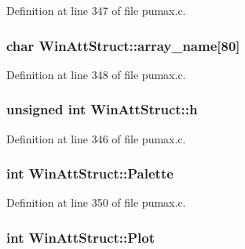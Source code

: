 \-Definition at line 347 of file pumax.\-c.

\hypertarget{struct_win_att_struct_a160c20895e7f5cd3463c955778f18338}{
\subsubsection[{array\-\_\-name}]{\setlength{\rightskip}{0pt plus 5cm}char {\bf \-Win\-Att\-Struct\-::array\-\_\-name}\mbox{[}80\mbox{]}}}
\label{struct_win_att_struct_a160c20895e7f5cd3463c955778f18338}


\-Definition at line 348 of file pumax.\-c.

\hypertarget{struct_win_att_struct_aa9c1c94dee4ebbe95eb392f738835055}{
\subsubsection[{h}]{\setlength{\rightskip}{0pt plus 5cm}unsigned int {\bf \-Win\-Att\-Struct\-::h}}}
\label{struct_win_att_struct_aa9c1c94dee4ebbe95eb392f738835055}


\-Definition at line 346 of file pumax.\-c.

\hypertarget{struct_win_att_struct_a75ef0752e759450856fd5967bdb36587}{
\subsubsection[{\-Palette}]{\setlength{\rightskip}{0pt plus 5cm}int {\bf \-Win\-Att\-Struct\-::\-Palette}}}
\label{struct_win_att_struct_a75ef0752e759450856fd5967bdb36587}


\-Definition at line 350 of file pumax.\-c.

\hypertarget{struct_win_att_struct_ac172f6d90a125507144c20f703b4a0d4}{
\subsubsection[{\-Plot}]{\setlength{\rightskip}{0pt plus 5cm}int {\bf \-Win\-Att\-Struct\-::\-Plot}}}
\label{struct_win_att_struct_ac172f6d90a125507144c20f703b4a0d4}


